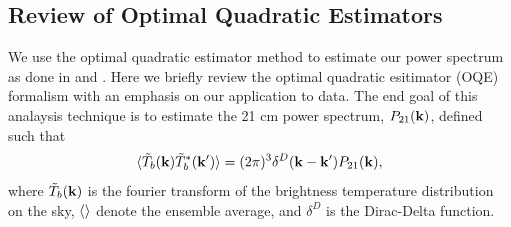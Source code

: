\documentclass[twocolumn,numberedappendix]{emulateapj} \shorttitle{PSA64}
\begin{document}
%
%
\subsection{Review of Optimal Quadratic Estimators}
We use the optimal quadratic estimator method to estimate our power spectrum as
done in \cite{dillon_et_al2013a} and \cite{liu_tegmark2011}.  Here we briefly review the
optimal quadratic esitimator (OQE) formalism with an emphasis on our application
to data. The end goal of this analaysis technique is to estimate the 21 cm
power spectrum, $P_{21}(\mathbf{k})$, defined such that 
\begin{equation}
\label{eqn:pspec_def}
    \expval{\tilde{T}_{b}(\k)\tilde{T}^{*}_{b}(\k^{\prime})} =
            (2\pi)^{3}\delta^{D}(\k - \k^{\prime})P_{21}(\k),
\end{equation}
where $\tilde{T}_{b}(\mathbf{k})$ is the fourier transform of the brightness temperature
distribution on the sky, $\langle  \rangle$ denote the ensemble average, and
$\delta^{D}$ is the Dirac-Delta function. 
\end{document}
